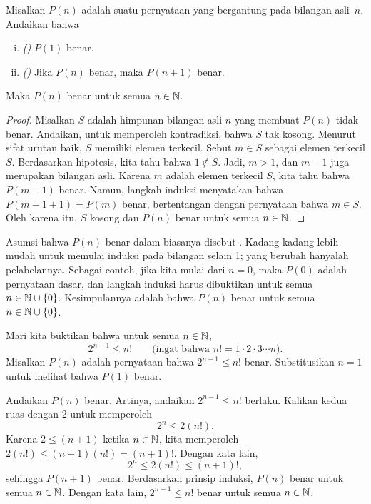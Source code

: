 \begin{thm} \label{induction:thm}
Misalkan $P(n)$ adalah suatu pernyataan yang bergantung pada bilangan
asli~$n$.  Andaikan bahwa
\begin{enumerate}[(i)]
\item \emph{()} $P(1)$ benar.
\item \emph{()} Jika $P(n)$ benar, maka $P(n+1)$ benar.
\end{enumerate}
Maka $P(n)$ benar untuk semua $n \in {\mathbb{N}}$.
\end{thm}

\begin{proof}
Misalkan $S$ adalah himpunan bilangan asli $n$ yang membuat $P(n)$
tidak benar.  Andaikan, untuk memperoleh kontradiksi, bahwa
$S$ tak kosong.  Menurut sifat urutan baik, $S$ memiliki elemen terkecil.
Sebut $m \in S$ sebagai elemen terkecil $S$.  Berdasarkan hipotesis, kita tahu
bahwa $1 \notin S$.  Jadi, $m > 1$, dan $m-1$ juga merupakan bilangan asli.
Karena $m$ adalah elemen terkecil $S$, kita tahu bahwa $P(m-1)$ benar.
Namun, langkah induksi menyatakan bahwa $P(m-1+1) = P(m)$ benar,
bertentangan dengan pernyataan bahwa $m \in S$.  Oleh karena itu, $S$ kosong
dan $P(n)$ benar untuk semua $n \in {\mathbb{N}}$.
\end{proof}

Asumsi bahwa
$P(n)$ benar dalam 
biasanya disebut \emph{}.
Kadang-kadang lebih mudah untuk memulai induksi
pada bilangan selain 1;
yang berubah hanyalah pelabelannya.
Sebagai contoh,
jika kita mulai dari $n=0$, maka $P(0)$ adalah pernyataan dasar,
dan langkah induksi harus dibuktikan untuk semua
$n \in {\mathbb{N}} \cup \{ 0 \}$.
Kesimpulannya adalah bahwa $P(n)$ benar untuk semua
$n \in {\mathbb{N}} \cup \{ 0 \}$.

\begin{example}
Mari kita buktikan bahwa untuk semua $n \in {\mathbb{N}}$,
\begin{equation*}
2^{n-1} \leq n! \qquad \text{(ingat bahwa } n! = 1 \cdot 2 \cdot 3 \cdots n\text{)}.
\end{equation*}
Misalkan $P(n)$ adalah pernyataan bahwa
$2^{n-1} \leq n!$ benar.
Substitusikan $n=1$ untuk melihat bahwa $P(1)$ benar.

Andaikan $P(n)$ benar.  Artinya, andaikan
$2^{n-1} \leq n!$ berlaku.  Kalikan kedua ruas dengan 2 untuk memperoleh
\begin{equation*}
2^n \leq 2(n!) .
\end{equation*}
Karena $2 \leq (n+1)$ ketika $n \in {\mathbb{N}}$, kita memperoleh
$2(n!) \leq (n+1)(n!) = (n+1)!$.  Dengan kata lain,
\begin{equation*}
2^n \leq 2(n!) \leq  (n+1)!,
\end{equation*}
sehingga $P(n+1)$ benar.  Berdasarkan prinsip induksi,
$P(n)$ benar untuk semua $n \in {\mathbb{N}}$.  Dengan kata lain,
$2^{n-1} \leq n!$ benar untuk semua $n \in {\mathbb{N}}$.
\end{example}

